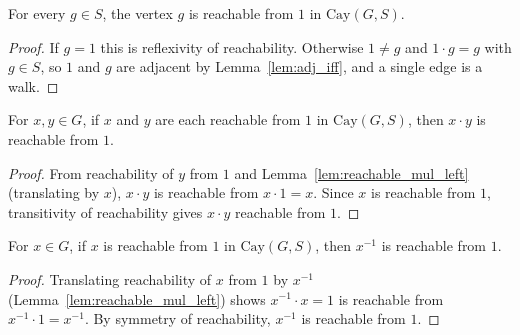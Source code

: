\begin{lemma}
    \label{lem:reachable_generator}
    \leanok
    For every $g \in S$, the vertex $g$ is reachable from $1$ in $\mathrm{Cay}(G,S)$.
\end{lemma}
\begin{proof}
    If $g = 1$ this is reflexivity of reachability. Otherwise $1 \neq g$ and
    $1 \cdot g = g$ with $g \in S$, so $1$ and $g$ are adjacent by
    Lemma~\ref{lem:adj_iff}, and a single edge is a walk.
\end{proof}

\begin{lemma}
    \label{lem:reachable_one_mul}
    \leanok
    For $x, y \in G$, if $x$ and $y$ are each reachable from $1$ in
    $\mathrm{Cay}(G,S)$, then $x \cdot y$ is reachable from $1$.
\end{lemma}
\begin{proof}
    From reachability of $y$ from $1$ and Lemma~\ref{lem:reachable_mul_left}
    (translating by $x$), $x \cdot y$ is reachable from $x \cdot 1 = x$. Since $x$ is
    reachable from $1$, transitivity of reachability gives $x \cdot y$ reachable
    from $1$.
\end{proof}

\begin{lemma}
    \label{lem:reachable_one_inv}
    \leanok
    For $x \in G$, if $x$ is reachable from $1$ in $\mathrm{Cay}(G,S)$, then
    $x^{-1}$ is reachable from $1$.
\end{lemma}
\begin{proof}
    Translating reachability of $x$ from $1$ by $x^{-1}$
    (Lemma~\ref{lem:reachable_mul_left}) shows $x^{-1} \cdot x = 1$ is reachable from
    $x^{-1} \cdot 1 = x^{-1}$. By symmetry of reachability, $x^{-1}$ is reachable
    from $1$.
\end{proof}

